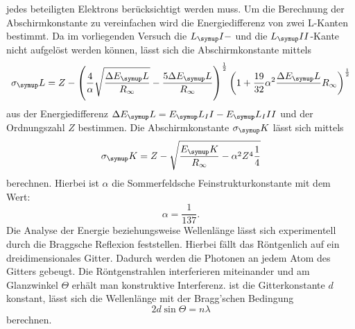jedes beteiligten Elektrons berücksichtigt werden muss. Um die Berechnung der
Abschirmkonstante zu vereinfachen wird die Energiedifferenz von zwei L-Kanten
bestimmt.
Da im vorliegenden Versuch die $L_\su{I}-$ und die $L_\su{II}$-Kante nicht
aufgelöst werden können, lässt sich die Abschirmkonstante mittels
\begin{equation}
  \sigma_\su{L}=Z-\left(\frac{4}{\alpha}\sqrt{\frac{\Delta E_\su{L}}{R_\infty}
  }-\frac{5\Delta E_\su{L}}{R_\infty}\right)^{\frac{1}{2}}\left(1+\frac{19}{32}
  \alpha^2\frac{\Delta E_\su{L}}{}R_\infty\right)^{\frac{1}{2}}
  \label{eqn:abschirmL}
\end{equation}
aus der Energiedifferenz $\Delta E_\su{L}=E_\su{L_II}-E_\su{L_III}$ und der
Ordnungszahl $Z$ bestimmen.
Die Abschirmkonstante $\sigma_\su{K}$ lässt sich mittels
\begin{equation}
  \sigma_\su{K}=Z-\sqrt{\frac{E_\su{K}}{R_\infty}-\alpha^2Z^4\frac{1}{4}}
  \label{eqn:abschirmK}
\end{equation}
berechnen. Hierbei ist $\alpha$ die Sommerfeldsche Feinstrukturkonstante mit
dem Wert:
\begin{equation}
  \alpha = \frac{1}{137}.
\end{equation}
Die Analyse der Energie beziehungsweise Wellenlänge
lässt sich experimentell durch die Braggsche Reflexion feststellen. Hierbei
fällt das Röntgenlich auf ein dreidimensionales Gitter. Dadurch werden die
Photonen an jedem Atom des Gitters gebeugt. Die Röntgenstrahlen interferieren
miteinander und am Glanzwinkel $\Theta$ erhält man konstruktive Interferenz.
ist die Gitterkonstante $d$ konstant, lässt sich die Wellenlänge mit der
Bragg'schen Bedingung
\begin{equation}
  2d\sin\Theta=n\lambda
  \label{eqn:bragg}
\end{equation}
berechnen.
